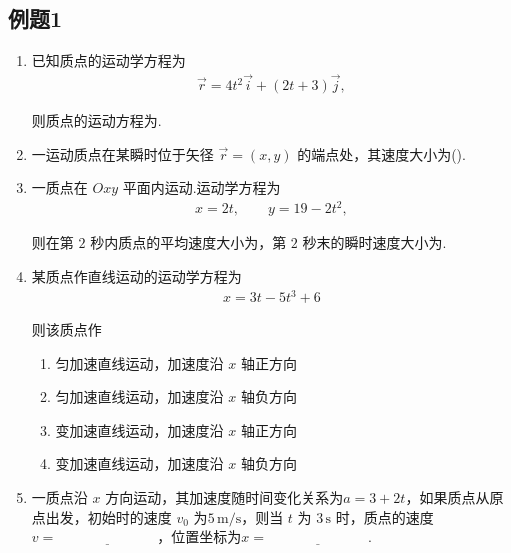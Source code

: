 \subsection{例题1}

\begin{enumerate}

\item 已知质点的运动学方程为
\begin{align*}
	\vec{r}=4t^{2}\vec{i}+(2t+3)\vec{j},
\end{align*}

则质点的运动方程为\underline{\hspace{4cm}}.


\item 一运动质点在某瞬时位于矢径 $\vec{r}=(x,y)$ 的端点处，其速度大小为(\quad).


\item 一质点在 $Oxy$ 平面内运动.运动学方程为
\begin{align*}
	x=2t,\qquad y=19-2t^2,
\end{align*}

则在第 $2$ 秒内质点的平均速度大小为\underline{\hspace{1.5cm}}，第 $2$ 秒末的瞬时速度大小为\underline{\hspace{1.5cm}}.


\item 某质点作直线运动的运动学方程为
\begin{align*}
	x = 3t - 5t^3 + 6
\end{align*}

则该质点作

\begin{enumerate}
	\item[A.] 匀加速直线运动，加速度沿 $x$ 轴正方向
	\item[B.] 匀加速直线运动，加速度沿 $x$ 轴负方向
	\item[C.] 变加速直线运动，加速度沿 $x$ 轴正方向
	\item[D.] 变加速直线运动，加速度沿 $x$ 轴负方向
\end{enumerate}

\item 一质点沿 $x$ 方向运动，其加速度随时间变化关系为$a = 3 + 2t$，如果质点从原点出发，初始时的速度 $v_0$ 为$5\,\mathrm{m/s}$，则当 $t$ 为 $3\,\mathrm{s}$ 时，质点的速度$v = \underline{\hspace{3cm}}$，位置坐标为$x = \underline{\hspace{3cm}}$.


\end{enumerate}

